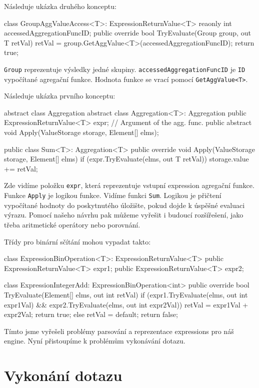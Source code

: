 Následuje ukázka druhého konceptu:
\begin{code}
class GroupAggValueAccess<T>: ExpressionReturnValue<T> {
  reaonly int accessedAggregationFuncID; 
  public override bool TryEvaluate(Group group, out T retVal) {
    retVal = group.GetAggValue<T>(accessedAggregationFuncID);
    return true; }}
\end{code}
\verb+Group+ reprezentuje výsledky jedné skupiny.
\verb+accessedAggregationFuncID+ je \verb+ID+ vypočítané agregační funkce.
Hodnota funkce se vrací pomocí \verb+GetAggValue<T>+.

Následuje ukázka prvního konceptu:
\begin{code}
abstract class Aggregation { }
abstract class Aggregation<T>: Aggregation {
  public ExpressionReturnValue<T> expr; // Argument of the agg. func.
  public abstract void Apply(ValueStorage storage, Element[] elms);
}

public class Sum<T>: Aggregation<T>{
  public override void Apply(ValueStorage storage, Element[] elms) {
    if (expr.TryEvaluate(elms, out T retVal)) {
      storage.value += retVal;
    }
  }
}
\end{code}
Zde vidíme položku \verb+expr+, která reprezentuje vstupní expression agregační funkce.
Funkce \verb+Apply+ je logikou funkce. 
Vidíme funkci \verb+Sum+. 
Logikou je přičtení vypočítané hodnoty do poskytnutého úložište, pokud dojde k úspěšné evaluaci výrazu.
Pomocí našeho návrhu pak můžeme vyřešit i budoucí rozšířešení, jako třeba aritmetické operátory nebo porovnání.

Třídy pro binární sčítání mohou vypadat takto:
\begin{code}
class ExpressionBinOperation<T>: ExpressionReturnValue<T> {
  public ExpressionReturnValue<T> expr1;
  public ExpressionReturnValue<T> expr2;
}

class ExpressionIntegerAdd: ExpressionBinOperation<int>{
  public override bool TryEvaluate(Element[] elms, out int retVal) {
    if (expr1.TryEvaluate(elms, out int expr1Val) &&
        expr2.TryEvaluate(elms, out int expr2Val)) {
      retVal = expr1Val + expr2Val;
      return true;
    } else {
      retVal = default;
      return false;
    }
  }
}
\end{code}

Tímto jsme vyřešeli problémy parsování a reprezentace expressions pro náš engine.
Nyní přistoupíme k problémům vykonávání dotazu.

\clearpage

\section{Vykonání dotazu}

